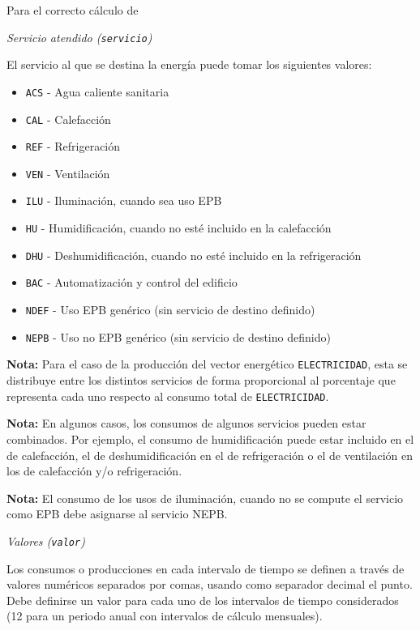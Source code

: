 \documentclass[10pt,notitlepage,oneside,a4paper]{article}
\begin{document}
Para el correcto cálculo de 

\textit{Servicio atendido (\texttt{servicio})}

El servicio al que se destina la energía puede tomar los siguientes valores:

\begin{itemize}
\item \texttt{ACS} - Agua caliente sanitaria
\item \texttt{CAL} - Calefacción
\item \texttt{REF} - Refrigeración
\item \texttt{VEN} - Ventilación
\item \texttt{ILU} - Iluminación, cuando sea uso EPB
\item \texttt{HU} - Humidificación, cuando no esté incluido en la calefacción
\item \texttt{DHU} - Deshumidificación, cuando no esté incluido en la refrigeración
\item \texttt{BAC} - Automatización y control del edificio
\item \texttt{NDEF} - Uso EPB genérico (sin servicio de destino definido)
\item \texttt{NEPB} - Uso no EPB genérico (sin servicio de destino definido)
\end{itemize}

\begin{myquote}\small
\textbf{Nota:} Para el caso de la producción del vector energético \texttt{ELECTRICIDAD}, esta se distribuye entre los distintos servicios de forma proporcional al porcentaje que representa cada uno respecto al consumo total de \texttt{ELECTRICIDAD}.

\textbf{Nota:} En algunos casos, los consumos de algunos servicios pueden estar combinados. Por ejemplo, el consumo de humidificación puede estar incluido en el de calefacción, el de deshumidificación en el de refrigeración o el de ventilación en los de calefacción y/o refrigeración.

\textbf{Nota:} El consumo de los usos de iluminación, cuando no se compute el servicio como EPB debe asignarse al servicio NEPB.
\end{myquote}

\textit{Valores (\texttt{valor})}

Los consumos o producciones en cada intervalo de tiempo se definen a través de valores numéricos separados por comas, usando como separador decimal el punto. Debe definirse un valor para cada uno de los intervalos de tiempo considerados (12 para un periodo anual con intervalos de cálculo mensuales).
\end{document}
